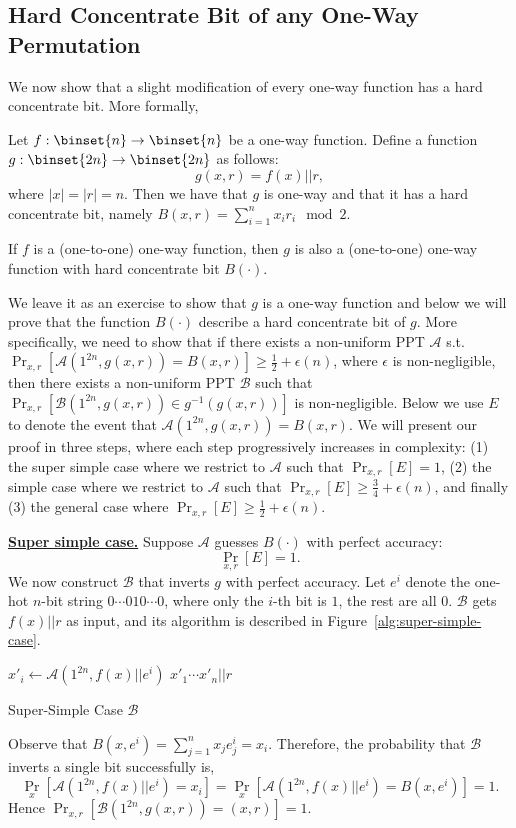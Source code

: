 \documentclass[12pt]{tufte-book}
\newcommand{\ma}{\mathcal{A}}
\begin{document}
\subsection{Hard Concentrate Bit of any One-Way Permutation}
We now show that a slight modification of every one-way function has a hard concentrate bit. More formally,
\begin{theorem}\label{thm:hard-concentrate-bit}
Let  $f:\binset{n} \rightarrow \binset{n}$ be a one-way function.
Define a function $g:\binset{2n} \rightarrow \binset{2n}$ as follows:
$$g(x,r) = f(x) || r,$$
where $|x| = |r| =n$. Then we have that $g$ is one-way and that it has a hard concentrate bit, namely $B(x, r) = \sum_{i=1}^n x_i r_i\mod 2$.
\end{theorem}
\begin{remark}
If $f$ is a (one-to-one) one-way function, then $g$ is also a (one-to-one) one-way function with hard concentrate bit $B(\cdot)$.
\end{remark}
\proof
We leave it as an exercise to show that $g$ is a one-way function and below we will prove that the function $B(\cdot)$ describe a hard concentrate bit of $g$.
More specifically, we need to show that if there exists a non-uniform PPT  $\ma$ s.t. $\Pr_{x,r}[\ma(1^{2n},g(x,r)) = B(x,r)] \ge \frac{1}{2} + \epsilon(n)$, where $\epsilon$ is non-negligible, then there exists a non-uniform PPT $\mathcal{B}$ such that $\Pr_{x,r}[\mathcal{B}(1^{2n}, g(x,r)) \in g^{-1}(g(x,r))]$ is non-negligible.
Below we use $E$ to denote the event that $\ma(1^{2n},g(x,r)) = B(x,r)$.
We will present our proof in three steps, where each step progressively increases in complexity:
(1) the super simple case where we restrict to $\ma$ such that $\Pr_{x,r}[E] = 1$,
(2) the simple case where we restrict to $\ma$ such that $\Pr_{x,r}[E] \geq \frac{3}{4} + \epsilon(n)$,
and finally (3) the general case where $\Pr_{x,r}[E] \geq \frac{1}{2} + \epsilon(n)$.

\medskip
\noindent\textbf{\underline{Super simple case.}}
Suppose $\ma$ guesses $B(\cdot)$ with perfect accuracy:
$$\Pr_{x,r}[E] =1.$$
We now construct $\mathcal{B}$ that inverts $g$ with perfect accuracy.
Let $e^i$ denote the one-hot $n$-bit string $0\cdots 0 1 0 \cdots0$, where only the $i$-th bit is $1$, the rest are all $0$.
$\mathcal{B}$ gets $f(x)||r$ as input, and its algorithm is described in Figure~\ref{alg:super-simple-case}.

\begin{marginfigure}
\begin{algorithmic}
    \State $x'_i \gets \ma(1^{2n}, f(x)||e^i)$
\EndFor
\State \Return $x'_1\cdots x'_n || r$
\end{algorithmic}
\caption{Super-Simple Case $\mathcal{B}$} \label{alg:super-simple-case}
\end{marginfigure}
Observe that $B(x,e^i) = \sum_{j=1}^n x_je^i_j = x_i$. Therefore, the probability that $\mathcal{B}$ inverts a single bit successfully is,
$$\Pr_{x}\left[\ma(1^{2n}, f(x)||e^i)=x_i\right] =  \Pr_{x}\left[\ma(1^{2n}, f(x)||e^i)=B(x,e^i)\right] = 1.$$
Hence $\Pr_{x,r}[\mathcal{B}(1^{2n}, g(x,r)) = (x,r)] = 1$.
\end{document}

